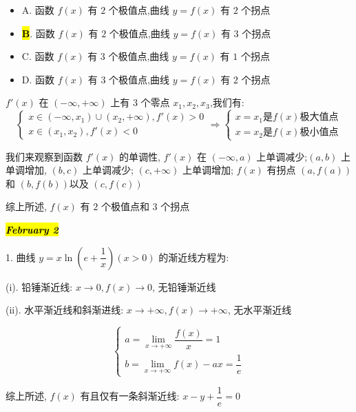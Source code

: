 \begin{itemize}
	\item A. 函数 $f(x)$ 有 $2$ 个极值点,曲线 $y=f(x)$ 有 $2$ 个拐点
	\item \hl{\textbf{B}}. 函数 $f(x)$ 有 $2$ 个极值点,曲线 $y=f(x)$ 有 $3$ 个拐点
	\item C. 函数 $f(x)$ 有 $3$ 个极值点,曲线 $y=f(x)$ 有 $1$ 个拐点
	\item D. 函数 $f(x)$ 有 $3$ 个极值点,曲线 $y=f(x)$ 有 $2$ 个拐点
\end{itemize}
\begin{solution}

	$f'(x)$ 在 $(-\infty,+\infty)$ 上有 $3$ 个零点 $x_{1},x_{2},x_{3}$,我们有:
	$$\begin{cases}
	x\in(-\infty,x_{1})\cup (x_{2},+\infty), f'(x) > 0\\
	x\in(x_{1},x_{2}), f'(x) < 0
	\end{cases}\Rightarrow 
	\begin{cases}
	x = x_{1}\text{是} f(x) \text{极大值点}\\
	x = x_{2}\text{是} f(x) \text{极小值点}
	\end{cases}$$

	我们来观察到函数 $f'(x)$ 的单调性, $f'(x)$ 在 $(-\infty,a)$ 上单调减少;$(a,b)$ 上单调增加, $(b,c)$ 上单调减少; $(c,+\infty)$ 上单调增加;
	$f(x)$ 有拐点 $(a,f(a))$ 和 $(b,f(b))$以及 $(c,f(c))$

	综上所述, $f(x)$ 有 $2$ 个极值点和 $3$ 个拐点
\end{solution}

\hl{\textbf{\textit{February 2}}}

1. 曲线 $y=x\ln\left( e+\dfrac{1}{x}\right)(x>0) $ 的渐近线方程为:
\begin{solution}

	(i). 铅锤渐近线: $x\to 0, f(x)\to 0$, 无铅锤渐近线

	(ii). 水平渐近线和斜渐进线: $x\to +\infty, f(x)\to +\infty$, 无水平渐近线

	$$\begin{cases}
	a = \lim\limits_{x\to +\infty}\dfrac{f(x)}{x} = 1\\
	b = \lim\limits_{x\to +\infty}f(x)-ax = \dfrac{1}{e}
	\end{cases}$$

	综上所述, $f(x)$ 有且仅有一条斜渐近线: $x-y+\dfrac{1}{e} = 0$
\end{solution}

